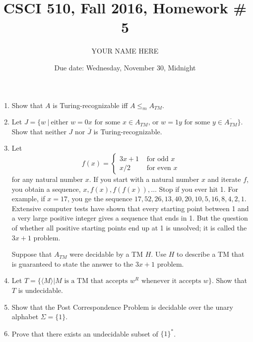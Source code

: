 \documentclass{article}
\title{CSCI 510, Fall 2016, Homework \# 5}
\author{YOUR NAME HERE}
\date{Due date: Wednesday, November 30, Midnight}
\begin{document}
\maketitle
\begin{enumerate}
\item Show that $A$ is Turing-recognizable iff $A\leq_m A_{TM}$.

\item Let $J=\{w\ |\ \mbox{either $w=0x$ for some $x\in A_{TM}$, or
  $w=1y$ for some $y\in \overline{A_{TM}}$}\}$.  Show that neither $J$
  nor $\overline{J}$ is Turing-recognizable.

\item Let
  \[
  f(x) = \left\{\begin{array}{ll}
  3x+1 & \mbox{ for odd $x$}\\
  x/2 & \mbox{ for even $x$}
  \end{array}
  \right.
  \]
for any natural number $x$.  If you start with a natural number $x$
and iterate  $f$, you obtain a sequence, $x, f(x),
f(f(x)),\ldots$ Stop if you ever hit 1.  For example, if $x=17$, you
ge the sequence $17,52,26,13,40,20,10,5,16,8,4,2,1$.  Extensive
computer tests have shown that every starting point between 1 and a
very large positive integer gives a sequence that ends in 1.  But the
question of whether all positive starting points end up at 1 is
unsolved;  it is called the $3x+1$ problem.

Suppose that $A_{TM}$ were decidable by a TM $H$.  Use $H$ to describe
a TM that is guaranteed to state the answer to the $3x+1$ problem.

\item Let $T=\{\langle M \rangle | \mbox{$M$ is a TM that accepts
  $w^R$ whenever it accepts $w$}\}$.  Show that $T$ is undecidable.

\item Show that the Post Correspondence Problem is decidable over the
  unary alphabet $\Sigma = \{1\}$.

\item Prove that there exists an undecidable subset of $\{1\}^*$.


\end{enumerate}
\end{document}
